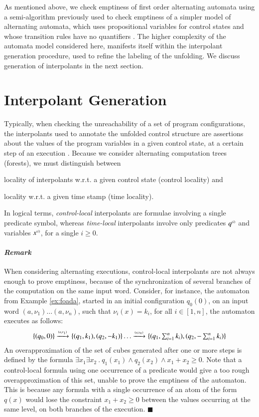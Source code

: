 As mentioned above, we check emptiness of first order alternating
automata using a semi-algorithm previously used to check emptiness of
a simpler model of alternating automata, which uses propositional
variables for control states and whose transition rules have no
quantifiers \cite{IosifXu18}. The higher complexity of the automata
model considered here, manifests itself within the interpolant
generation procedure, used to refine the labeling of the unfolding. We
discuss generation of interpolants in the next section.

\section{Interpolant Generation}\label{sec:interpolants}

Typically, when checking the unreachability of a set of program
configurations, the interpolants used to annotate the unfolded control
structure are assertions about the values of the program variables in
a given control state, at a certain step of an execution
\cite{McMillan06}. Because we consider alternating computation trees
(forests), we must distinguish between
\begin{inparaenum}[(i)]
\item locality of interpolants w.r.t. a given control state (control
  locality) and
%
\item locality w.r.t. a given time stamp (time locality).
\end{inparaenum} 
In logical terms, \emph{control-local} interpolants are formulae
involving a single predicate symbol, whereas \emph{time-local}
interpolants involve only predicates ${q}^{\scriptscriptstyle{({i})}}$ and variables
${x}^{\scriptscriptstyle{({i})}}$, for a single $i \geq 0$.

\paragraph{\em Remark}
When considering alternating executions, control-local interpolants
are not always enough to prove emptiness, because of the
synchronization of several branches of the computation on the same
input word. Consider, for instance, the automaton from Example
\ref{ex:foada}, started in an initial configuration $q_0(0)$, on an
input word $(a,\nu_1) \ldots (a,\nu_n)$, such that $\nu_i(x)=k_i$, for
all $i \in [1,n]$, the automaton executes as follows:
\[\begin{array}{c}
\{ (q_0,0) \} \xrightarrow{{\scriptscriptstyle (a,\nu_1)}}_{{\scriptstyle }} \{ (q_1,k_1),(q_2,-k_1) \} \ldots
\xrightarrow{{\scriptscriptstyle (a,\nu_{n})}}_{{\scriptstyle }} 
\{ (q_1,\sum_{i=1}^{n} k_i),(q_2,-\sum_{i=1}^{n} k_i) \}
\end{array}\]
An overapproximation of the set of cubes generated after one or more
steps is defined by the formula $\exists x_1 \exists x_2 ~.~ q_1(x_1)
\wedge q_2(x_2) \wedge x_1+x_2 \geq 0$. Note that a control-local formula
using one occurrence of a predicate would give a too rough
overapproximation of this set, unable to prove the emptiness of the
automaton. This is because any formula with a single occurrence of an
atom of the form $q(x)$ would lose the constraint $x_1+x_2 \geq 0$
between the values occurring at the same level, on both branches of
the execution. \hfill$\blacksquare$

